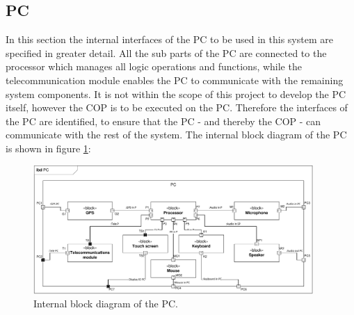 \subsection{PC}
In this section the internal interfaces of the PC to be used in this system are specified in greater detail. All the sub parts of the PC are connected to the processor which manages all logic operations and functions, while the telecommunication module enables the PC to communicate with the remaining system components. It is not within the scope of this project to develop the PC itself, however the COP is to be executed on the PC. Therefore the interfaces of the PC are identified, to ensure that the PC - and thereby the COP - can communicate with the rest of the system. The internal block diagram of the PC is shown in figure \ref{fig:internal_diagram_PC}:
\begin{figure}[H]
\centering
\includegraphics[width=0.95\textwidth]
{billeder/ibd_PC.pdf}
\caption{Internal block diagram of the PC.}
\label{fig:internal_diagram_PC}
\end{figure}


